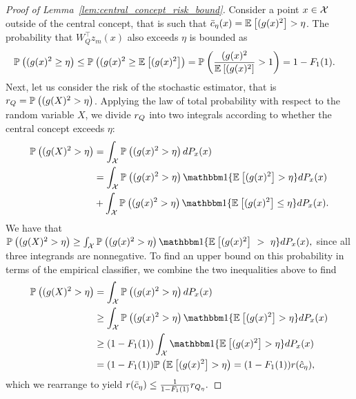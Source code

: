 \documentclass[onefignum,onetabnum]{siamart171218}
\begin{document}
\begin{proof}[Proof of Lemma~\ref{lem:central_concept_risk_bound}]
    Consider a point $x\in\dom$ outside of the central concept, that is such
    that $\bar{c}_\eta(x) = \Ex{(g(x)^2} > \eta$. The probability that $W_Q^\top z_m(x)$ also
    exceeds $\eta$ is bounded as
    \begin{align}
        \Pr{(g(x)^2 \ge \eta}
        &\le
        \Pr{(g(x)^2 \ge \Ex{(g(x)^2}}
        =\Pr{\frac{(g(x)^2}{\Ex{(g(x)^2}} > 1}
        =1-F_1(1).
    \end{align}
    Next, let us consider the risk of the stochastic estimator, that is
    $\srisk=\Pr{(g(X)^2 > \eta}$. Applying the law of total probability
    with respect to the random variable $X$, we divide $\srisk$ into two
    integrals according to whether the central concept exceeds $\eta$:
    \begin{align}
        \Pr{(g(X)^2 > \eta}
        &=
        \int_\dom \Pr{(g(x)^2 > \eta} dP_x(x)\\
        &=
        \int_\dom
        \Pr{(g(x)^2 > \eta}
        \ind{\Ex{(g(x)^2} > \eta}
        dP_x(x)\\
        &+
        \int_\dom
        \Pr{(g(x)^2 > \eta}
        \ind{\Ex{(g(x)^2} \le \eta}
        dP_x(x).
    \end{align}
    We have that
    $
        \Pr{(g(X)^2 > \eta}
        \ge
        \int_\dom
        \Pr{(g(x)^2 > \eta}
        \ind{\Ex{(g(x)^2}~>~\eta}
        dP_x(x),
        $
    since all three integrands are nonnegative.
    To find an upper bound on this
    probability in terms of the empirical classifier, we combine the two
    inequalities above to find
    \begin{align}
        \Pr{(g(X)^2 > \eta}
        &=
        \int_\dom \Pr{(g(x)^2 > \eta} dP_x(x)\\
        &\ge
        \int_\dom \Pr{(g(x)^2 > \eta}
             \ind{\Ex{(g(x)^2} > \eta} dP_x(x)\\
        &\ge
        (1-F_1(1))
        \int_\dom \ind{\Ex{(g(x)^2} > \eta} dP_x(x)\\
        &= (1-F_1(1))\Pr{\Ex{(g(x)^2} > \eta}
        = (1-F_1(1)) r(\hat{c}_\eta),
    \end{align}
    which we rearrange to yield
    $
        r(\bar{c}_\eta) \le \frac{1}{1-F_1(1)}\srisk[Q_\eta].
    $
\end{proof}
\end{document}
